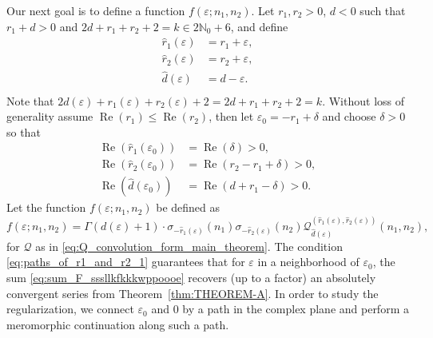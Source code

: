 \documentclass[]{article}
\renewcommand{\Re}{\operatorname{Re}}
\begin{document}
Our next goal is to define a function $f(\varepsilon; n_1, n_2)$. 
Let $r_1,r_2 > 0$, $d < 0$ such that $r_1 + d > 0$  and $2d+r_1+r_2+2 = k \in 2 \mathbb{N}_0 + 6$, and define 
\begin{equation}\label{eq:paths_of_r1_and_r2-take2}
\begin{split}
  \hat   r_1(\varepsilon) &= r_1+\varepsilon, \\
\hat     r_2(\varepsilon) &= r_2+\varepsilon, \\
\hat    d(\varepsilon)   &= d-\varepsilon.\\
\end{split}
\end{equation}
Note that $  2 d(\varepsilon) +   r_1(\varepsilon)+  r_2(\varepsilon)+2 =  2d+r_1+r_2+2 = k.$
Without loss of generality assume $\Re(r_1)\le \Re(r_2)$, then let  $\varepsilon_0 = -r_1 + \delta$ and choose $\delta > 0$ so that
\begin{equation}\label{eq:paths_of_r1_and_r2_1}\begin{split}
    \Re( \hat r_1(\varepsilon_0)) &= \Re(\delta) > 0, \\
    \Re( \hat r_2(\varepsilon_0)) &= \Re( r_2 -r_1 +  \delta) > 0, \\
    \Re(\hat d(\varepsilon_0))   &= \Re(d+r_1 - \delta) > 0.
\end{split}\end{equation}
Let the function $f(\varepsilon; n_1, n_2)$ be defined as 
\begin{equation}\label{eq:f_eps_llalallll}
    f(\varepsilon; n_1, n_2) = \Gamma(d(\varepsilon)+1) \cdot  \sigma_{- \hat r_1 (\varepsilon) }(n_1) \sigma_{- \hat r_2 (\varepsilon)}(n_2) \mathcal{Q}^{(\hat r_1(\varepsilon), \hat r_2(\varepsilon) )}_{\hat d(\varepsilon)} (n_1,n_2),
\end{equation}
for $\mathcal{Q}$ as in \eqref{eq:Q_convolution_form_main_theorem}. 
The condition \eqref{eq:paths_of_r1_and_r2_1} guarantees that for $\varepsilon$ in a neighborhood of $\varepsilon_0$, the sum  \eqref{eq:sum_F_sssllkfkkkwppoooe} recovers (up to a factor) an absolutely convergent series from Theorem~\ref{thm:THEOREM-A}. In order to study the regularization, we connect $\varepsilon_0$ and $0$ by a path in the complex plane and perform a meromorphic continuation along such a path. 
\end{document}

